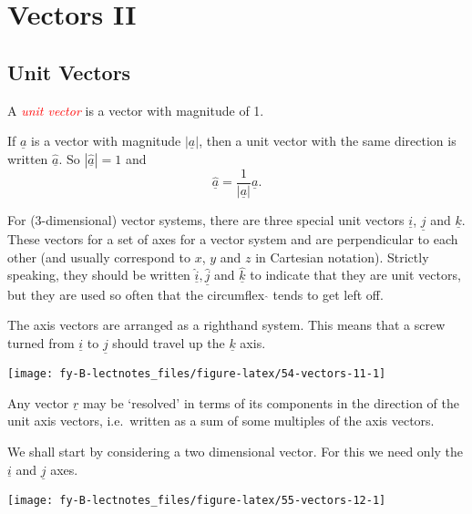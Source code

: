 \documentclass[
  11pt,
  oneside]{book}
\newcommand{\slide}{}
\theoremstyle{definition}
\theoremstyle{definition}
\theoremstyle{definition}
\theoremstyle{definition}
\theoremstyle{remark}
\begin{document}
\section{Vectors II}\label{vectors-ii}

\subsection{Unit Vectors}\label{unit-vectors}

A \textcolor{red}{\em unit vector} is a vector with magnitude of 1.

If \(\underline a\) is a vector with magnitude \(|\underline a|\), then a unit vector with the same direction is written \(\hat{\underline a}\). So \(|\hat{\underline a}| = 1\) and
\[
\hat{\underline a} = \frac1{|\underline a|}{\underline a}.
\]

\slide

For (3-dimensional) vector systems, there are three special unit vectors \(\underline i\), \(\underline j\) and \(\underline k\).
These vectors for a set of axes for a vector system and are perpendicular to each other (and usually correspond to \(x\), \(y\) and \(z\) in Cartesian notation).
Strictly speaking, they should be written \(\hat{\underline i}, \hat{\underline j}\) and \(\hat{\underline k}\) to indicate that they are unit vectors, but they are used so often that the circumflex \(\hat{}\) tends to get left off.

The axis vectors are arranged as a righthand system. This means that a screw turned from \(\underline i\) to \(\underline j\) should travel up the \(\underline k\) axis.

\begin{center}\texttt{[image: fy-B-lectnotes\_files/figure-latex/54-vectors-11-1]} \end{center}

\slide

Any vector \(\underline{r}\) may be `resolved' in terms of its components in the direction of the unit axis vectors, i.e.~written as a sum of some multiples of the axis vectors.

We shall start by considering a two dimensional vector. For this we need only the \(\underline i\) and \(\underline j\) axes.

\begin{center}\texttt{[image: fy-B-lectnotes\_files/figure-latex/55-vectors-12-1]} \end{center}
\end{document}
